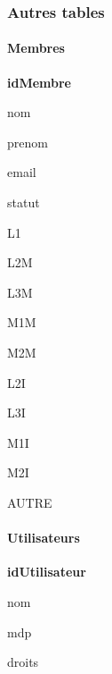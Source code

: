 \subsubsection*{Autres tables}

\paragraph*{Membres}


\begin{DoxyItemize}
\item {\bfseries id\+Membre}
\item nom
\item prenom
\item email
\item statut
\begin{DoxyItemize}
\item L1
\item L2M
\item L3M
\item M1M
\item M2M
\item L2I
\item L3I
\item M1I
\item M2I
\item A\+U\+T\+RE
\end{DoxyItemize}
\end{DoxyItemize}

\paragraph*{Utilisateurs}


\begin{DoxyItemize}
\item {\bfseries id\+Utilisateur}
\item nom
\item mdp
\item droits 
\end{DoxyItemize}